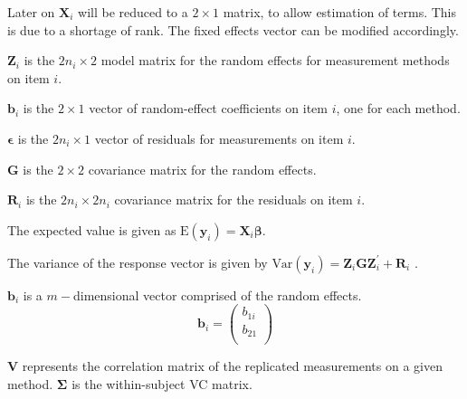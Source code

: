 \documentclass[12pt, a4paper]{report}
\theoremstyle{plain}
\theoremstyle{definition}
\theoremstyle{remark}
\begin{document}

Later on $\boldsymbol{X}_i$ will be reduced to a $2 \times 1$ matrix, to allow estimation of terms. This is due to a shortage of rank. The fixed effects vector can be modified accordingly.

$\boldsymbol{Z}_i$ is the $2n_i \times  2$ model matrix for the random effects for measurement methods on item $i$.\\
\bigskip

$\boldsymbol{b}_i$ is the $2 \times  1$ vector of random-effect coefficients on item $i$, one for each method.

$\boldsymbol{\epsilon}$  is the $2n_i \times  1$ vector of residuals for measurements on item $i$.\\
\bigskip

$\boldsymbol{G}$ is the $2 \times  2$ covariance matrix for the random effects.

$\boldsymbol{R}_i$ is the $2n_i \times  2n_i$ covariance matrix for the residuals on item $i$.

The expected value is given as $\mbox{E}(\boldsymbol{y}_i) = \boldsymbol{X}_i\boldsymbol{\beta}.$ \citep{hamlett}\\
\bigskip

The variance of the response vector is given by $\mbox{Var}(\boldsymbol{y}_i)  = \boldsymbol{Z}_i \boldsymbol{G} \boldsymbol{Z}_i^{\prime} + \boldsymbol{R}_i$ \citep{hamlett}.



$\boldsymbol{b}_{i}$ is a $m-$dimensional vector comprised of
the random effects.
\begin{equation}
\boldsymbol{b}_{i} = \left( \begin{array}{c}
b_{1i} \\
b_{21}  \\
\end{array}\right)
\end{equation}


$\boldsymbol{V}$ represents the correlation matrix of the replicated measurements on a given method.
$\boldsymbol{\Sigma}$ is the within-subject VC matrix.\\
\bigskip
\end{document}
